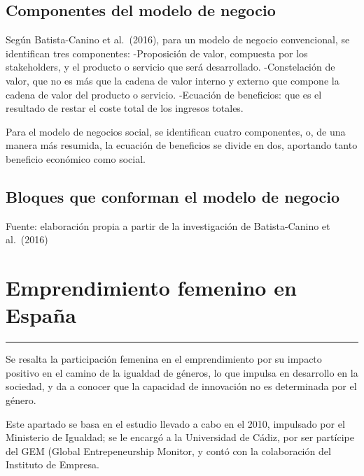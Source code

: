 \documentclass[
  letterpaper,
  DIV=11,
  numbers=noendperiod]{scrreprt}
\begin{document}
\hypertarget{componentes-del-modelo-de-negocio}{%
\subsection{Componentes del modelo de
negocio}\label{componentes-del-modelo-de-negocio}}

Según Batista-Canino et al.~(2016), para un modelo de negocio
convencional, se identifican tres componentes: -Proposición de valor,
compuesta por los stakeholders, y el producto o servicio que será
desarrollado. -Constelación de valor, que no es más que la cadena de
valor interno y externo que compone la cadena de valor del producto o
servicio. -Ecuación de beneficios: que es el resultado de restar el
coste total de los ingresos totales.

Para el modelo de negocios social, se identifican cuatro componentes, o,
de una manera más resumida, la ecuación de beneficios se divide en dos,
aportando tanto beneficio económico como social.

\hypertarget{bloques-que-conforman-el-modelo-de-negocio}{%
\subsection{Bloques que conforman el modelo de
negocio}\label{bloques-que-conforman-el-modelo-de-negocio}}

Fuente: elaboración propia a partir de la investigación de
Batista-Canino et al.~(2016)

\hypertarget{emprendimiento-femenino-en-espauxf1a}{%
\section{Emprendimiento femenino en
España}\label{emprendimiento-femenino-en-espauxf1a}}

\begin{center}\rule{0.5\linewidth}{0.5pt}\end{center}

Se resalta la participación femenina en el emprendimiento por su impacto
positivo en el camino de la igualdad de géneros, lo que impulsa en
desarrollo en la sociedad, y da a conocer que la capacidad de innovación
no es determinada por el género.

Este apartado se basa en el estudio llevado a cabo en el 2010, impulsado
por el Ministerio de Igualdad; se le encargó a la Universidad de Cádiz,
por ser partícipe del GEM (Global Entrepeneurship Monitor, y contó con
la colaboración del Instituto de Empresa.
\end{document}
